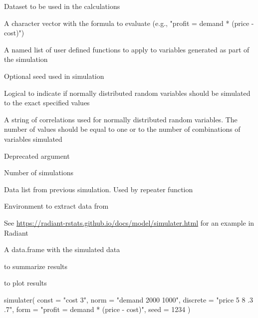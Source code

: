 \documentclass[a4paper]{book}
\begin{document}
\begin{Arguments}
\begin{ldescription}
\item[\code{data}] Dataset to be used in the calculations

\item[\code{form}] A character vector with the formula to evaluate (e.g., "profit = demand * (price - cost)")

\item[\code{funcs}] A named list of user defined functions to apply to variables generated as part of the simulation

\item[\code{seed}] Optional seed used in simulation

\item[\code{nexact}] Logical to indicate if normally distributed random variables should be simulated to the exact specified values

\item[\code{ncorr}] A string of correlations used for normally distributed random variables. The number of values should be equal to one or to the number of combinations of variables simulated

\item[\code{name}] Deprecated argument

\item[\code{nr}] Number of simulations

\item[\code{dataset}] Data list from previous simulation. Used by repeater function

\item[\code{envir}] Environment to extract data from
\end{ldescription}
\end{Arguments}
%
\begin{Details}
See \url{https://radiant-rstats.github.io/docs/model/simulater.html} for an example in Radiant
\end{Details}
%
\begin{Value}
A data.frame with the simulated data
\end{Value}
%
\begin{SeeAlso}
 to summarize results

 to plot results
\end{SeeAlso}
%
\begin{Examples}
\begin{ExampleCode}
simulater(
  const = "cost 3",
  norm = "demand 2000 1000",
  discrete = "price 5 8 .3 .7",
  form = "profit = demand * (price - cost)",
  seed = 1234
) %

\end{ExampleCode}
\end{Examples}
\end{document}
